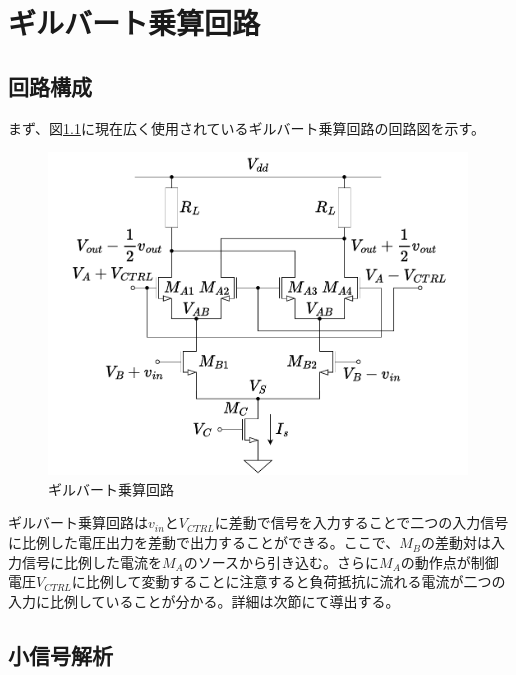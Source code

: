 \chapter{ギルバート乗算回路}
    \section{回路構成}
        まず、図\ref{fig:2_gilbert}に現在広く使用されているギルバート乗算回路の回路図を示す。
        \begin{figure}[bth]
            \begin{center}
                \includegraphics[width=0.99\textwidth]{figures/chapter2/gilbert.pdf}
                \caption{ギルバート乗算回路}
                \label{fig:2_gilbert}
            \end{center}
        \end{figure}
        ギルバート乗算回路は$v_{in}$と$V_{CTRL}$に差動で信号を入力することで二つの入力信号に比例した電圧出力を差動で出力することができる。ここで、$M_{B}$の差動対は入力信号に比例した電流を$M_{A}$のソースから引き込む。さらに$M_{A}$の動作点が制御電圧$V_{CTRL}$に比例して変動することに注意すると負荷抵抗に流れる電流が二つの入力に比例していることが分かる。詳細は次節にて導出する。


    \section{小信号解析}
